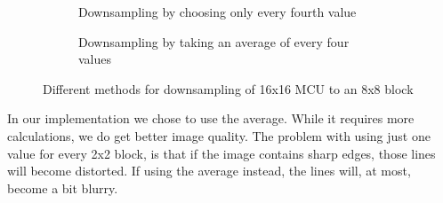\begin{figure}
    \centering
    \begin{subfigure}[b]{0.3\textwidth}
        \caption{Downsampling by choosing only every fourth value}
        \label{fig:downsampling4th}
    \end{subfigure}
    \qquad %
    \begin{subfigure}[b]{0.3\textwidth}
        \caption{Downsampling by taking an average of every four values}
        \label{fig:downsamplingAverage}
    \end{subfigure}
    \caption{Different methods for downsampling of 16x16 MCU to an 8x8 block}\label{fig:downsampling}
\end{figure}


In our implementation we chose to use the average.
While it requires more calculations, we do get better image quality.
The problem with using just one value for every 2x2 block, is that if the image contains sharp edges, those lines will become distorted.
If using the average instead, the lines will, at most, become a bit blurry.

